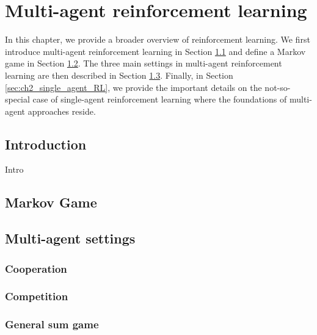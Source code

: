 \chapter{Multi-agent reinforcement learning} \label{ch:marl}

\begin{chapter_outline}

In this chapter, we provide a broader overview of reinforcement learning.
We first introduce multi-agent reinforcement learning in Section \ref{sec:ch2_Introduction} and define a Markov game in Section \ref{sec:ch2_Markov_Game}.
The three main settings in multi-agent reinforcement learning are then described in Section \ref{sec:ch2_multi_agent_settings}.
Finally, in Section \ref{sec:ch2_single_agent_RL}, we provide the important details on the not-so-special case of single-agent reinforcement learning where the foundations of multi-agent approaches reside.

\end{chapter_outline}

\section{Introduction} 
\label{sec:ch2_Introduction}
Intro

\section{Markov Game} 
\label{sec:ch2_Markov_Game}
\citep{MarkovGames}

\section{Multi-agent settings} 
\label{sec:ch2_multi_agent_settings}

\subsection{Cooperation} 
\label{sec:ch2_Cooperation}

\subsection{Competition} 
\label{sec:ch2_Competition}

\subsection{General sum game} 
\label{sec:ch2_general_sum_game}

